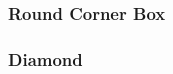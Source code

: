\begin{frame}
\frametitle{Round Corner Box}

\begin{center}
\end{center}
\end{frame}


\begin{frame}
\frametitle{Diamond}

\begin{center}
\end{center}
\end{frame}
